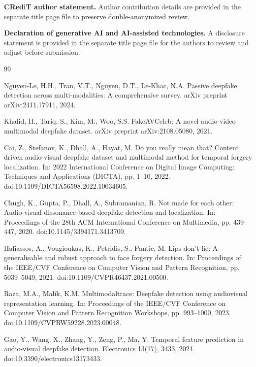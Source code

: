 \documentclass[preprint,12pt,number]{elsarticle}
\begin{document}
\textbf{CRediT author statement.} Author contribution details are provided in the separate title page file to preserve double-anonymized review.

\textbf{Declaration of generative AI and AI-assisted technologies.} A disclosure statement is provided in the separate title page file for the authors to review and adjust before submission.

\begin{thebibliography}{99}

Nguyen-Le, H.H., Tran, V.T., Nguyen, D.T., Le-Khac, N.A. Passive deepfake detection across multi-modalities: A comprehensive survey. arXiv preprint arXiv:2411.17911, 2024.

Khalid, H., Tariq, S., Kim, M., Woo, S.S. FakeAVCeleb: A novel audio-video multimodal deepfake dataset. arXiv preprint arXiv:2108.05080, 2021.

Cai, Z., Stefanov, K., Dhall, A., Hayat, M. Do you really mean that? Content driven audio-visual deepfake dataset and multimodal method for temporal forgery localization. In: 2022 International Conference on Digital Image Computing: Techniques and Applications (DICTA), pp. 1--10, 2022. doi:10.1109/DICTA56598.2022.10034605.

Chugh, K., Gupta, P., Dhall, A., Subramanian, R. Not made for each other: Audio-visual dissonance-based deepfake detection and localization. In: Proceedings of the 28th ACM International Conference on Multimedia, pp. 439--447, 2020. doi:10.1145/3394171.3413700.

Haliassos, A., Vougioukas, K., Petridis, S., Pantic, M. Lips don't lie: A generalisable and robust approach to face forgery detection. In: Proceedings of the IEEE/CVF Conference on Computer Vision and Pattern Recognition, pp. 5039--5049, 2021. doi:10.1109/CVPR46437.2021.00500.

Raza, M.A., Malik, K.M. Multimodaltrace: Deepfake detection using audiovisual representation learning. In: Proceedings of the IEEE/CVF Conference on Computer Vision and Pattern Recognition Workshops, pp. 993--1000, 2023. doi:10.1109/CVPRW59228.2023.00048.

Gao, Y., Wang, X., Zhang, Y., Zeng, P., Ma, Y. Temporal feature prediction in audio-visual deepfake detection. Electronics 13(17), 3433, 2024. doi:10.3390/electronics13173433.


\end{thebibliography}
\end{document}
